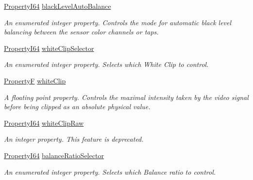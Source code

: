\begin{DoxyCompactItemize}
\hyperlink{group___common_interface_ga81749b2696755513663492664a18a893}{Property\+I64} \hyperlink{classmv_i_m_p_a_c_t_1_1acquire_1_1_gen_i_cam_1_1_analog_control_ab166c6492d2dcefd5bdb1df261743bdf}{black\+Level\+Auto\+Balance}
\begin{DoxyCompactList}\small\item\em An enumerated integer property. Controls the mode for automatic black level balancing between the sensor color channels or taps. \end{DoxyCompactList}\item 
\hyperlink{group___common_interface_ga81749b2696755513663492664a18a893}{Property\+I64} \hyperlink{classmv_i_m_p_a_c_t_1_1acquire_1_1_gen_i_cam_1_1_analog_control_ac5ca7e257c6325adf4f1f43d17d3f3cb}{white\+Clip\+Selector}
\begin{DoxyCompactList}\small\item\em An enumerated integer property. Selects which White Clip to control. \end{DoxyCompactList}\item 
\hyperlink{group___common_interface_gaf54865fe5a3d5cfd15f9a111b40d09f9}{Property\+F} \hyperlink{classmv_i_m_p_a_c_t_1_1acquire_1_1_gen_i_cam_1_1_analog_control_ac68d98eb5f08c7890fa0012adf778074}{white\+Clip}
\begin{DoxyCompactList}\small\item\em A floating point property. Controls the maximal intensity taken by the video signal before being clipped as an absolute physical value. \end{DoxyCompactList}\item 
\hyperlink{group___common_interface_ga81749b2696755513663492664a18a893}{Property\+I64} \hyperlink{classmv_i_m_p_a_c_t_1_1acquire_1_1_gen_i_cam_1_1_analog_control_a13f11756bb1316dd7b7e518898767527}{white\+Clip\+Raw}
\begin{DoxyCompactList}\small\item\em An integer property. This feature is deprecated. \end{DoxyCompactList}\item 
\hyperlink{group___common_interface_ga81749b2696755513663492664a18a893}{Property\+I64} \hyperlink{classmv_i_m_p_a_c_t_1_1acquire_1_1_gen_i_cam_1_1_analog_control_a1834e150b5a116bc677b13735d066e9e}{balance\+Ratio\+Selector}
\begin{DoxyCompactList}\small\item\em An enumerated integer property. Selects which Balance ratio to control. \end{DoxyCompactList}\item 

\end{DoxyCompactItemize}
